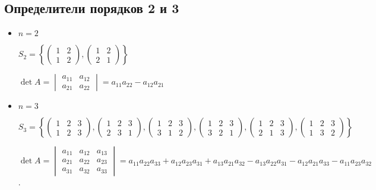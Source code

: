 \subsection{Определители порядков 2 и 3}
\begin{itemize}
\item
    $n = 2$

    $S_2 = \left\{ \begin{pmatrix} 1 & 2 \\ 1 & 2 \end{pmatrix}, \begin{pmatrix} 1 & 2 \\ 2 & 1 \end{pmatrix} \right\}$

    $\det A = \begin{vmatrix} a_{11} & a_{12} \\ a_{21} & a_{22} \end{vmatrix} = a_{11} a_{22} - a_{12} a_{21}$

\item
    $n = 3$

    $S_3 = \left\{
    \begin{pmatrix} 1 & 2 & 3 \\ 1 & 2 & 3 \end{pmatrix},
    \begin{pmatrix} 1 & 2 & 3 \\ 2 & 3 & 1 \end{pmatrix},
    \begin{pmatrix} 1 & 2 & 3 \\ 3 & 1 & 2 \end{pmatrix},
    \begin{pmatrix} 1 & 2 & 3 \\ 3 & 2 & 1 \end{pmatrix},
    \begin{pmatrix} 1 & 2 & 3 \\ 2 & 1 & 3 \end{pmatrix},
    \begin{pmatrix} 1 & 2 & 3 \\ 1 & 3 & 2 \end{pmatrix} \right\}$

    $\det A = \begin{vmatrix} a_{11} & a_{12} & a_{13} \\ a_{21} & a_{22} & a_{23} \\ a_{31} & a_{32} & a_{33} \end{vmatrix} = a_{11} a_{22} a_{33} + a_{12} a_{23} a_{31} + a_{13} a_{21} a_{32} - a_{13} a_{22} a_{31} - a_{12} a_{21} a_{33} - a_{11} a_{23} a_{32}$.
\end{itemize}